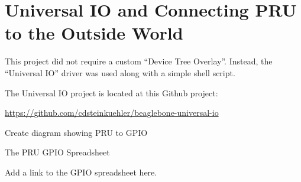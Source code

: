 \chapter{Universal IO and Connecting PRU to the Outside World}

This project did not require a custom ``Device Tree Overlay''.  Instead, the ``Universal IO'' driver was used along with a simple shell script.

The Universal IO project is located at this Github project:

\url{https://github.com/cdsteinkuehler/beaglebone-universal-io}

Create diagram showing PRU to GPIO


The PRU GPIO Spreadsheet

Add a link to the GPIO spreadsheet here.

